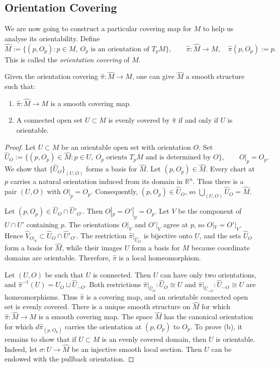 \documentclass[11pt,a4paper]{article}
\begin{document}
\subsection{Orientation Covering}
We are now going to construct a particular covering map for $M$ to help
us analyse its orientability. Define
\[
 \widehat M:=\{(p,O_p):p\in M,\ O_p\text{ is an orientation of }T_pM\},
 \qquad
 \widehat\pi\colon\widehat M\to M,\quad\widehat\pi(p,O_p):=p.
\]
This is called the \emph{orientation covering} of $M$.
\setcounter{theorem}{14}\begin{proposition}
\label{prop:m4-smooth-cover}
Given the orientation covering $\widehat\pi\colon\widehat M\to M$, one can
give $\widehat M$ a smooth structure such that:
\begin{enumerate}[label=(\alph*)]
 \setcounter{enumi}{0}\item $\widehat\pi\colon\widehat M\to M$ is a smooth covering map.
 \setcounter{enumi}{1}\item A connected open set $U\subset M$ is evenly covered by
 $\widehat\pi$ if and only if $U$ is orientable.
\end{enumerate}
\end{proposition}
\begin{proof}
Let $U\subset M$ be an orientable open set with orientation $O$. Set
\[
 \widehat U_O:=
 \{(p,O_p)\in\widehat M:p\in U,\ O_p\text{ orients }T_pM
 \text{ and is determined by }O\},
 \qquad O|_p=O_p.
\]
We show that $\{\widehat U_O\}_{(U,O)}$ forms a basis for $\widehat M$.
Let $(p,O_p)\in\widehat M$. Every chart at $p$ carries a natural orientation induced from its domain in $\mathbb R^n$. Thus there is
a pair $(U,O)$ with $O|_p=O_p$. Consequently, $(p,O_p)\in\widehat U_O$, so
$\bigcup_{(U,O)}\widehat U_O=\widehat M$.

Let $(p,O_p)\in\widehat U_O\cap\widehat U'_{O'}$.
Then $O|_p=O'|_p=O_p$. Let $V$ be the component of $U\cap U'$ containing
$p$. The orientations $O|_V$ and $O'|_V$ agree at $p$, so $O|_V=O'|_V$.
Hence $\widehat V_{O|_V}\subset\widehat U_O\cap\widehat U'_{O'}$.
The restriction $\widehat\pi|_{\widehat U_O}$ is bijective onto $U$,
and the sets $\widehat U_O$ form a basis for $\widehat M$, while their images $U$ form a basis for $M$ because coordinate domains are orientable. Therefore, $\widehat\pi$ is a local homeomorphism.

Let $(U,O)$ be such that $U$ is connected. Then $U$ can have only two
orientations, and
$\widehat\pi^{-1}(U)=\widehat U_O\sqcup\widehat U_{-O}$.
Both restrictions
$\widehat\pi|_{\widehat U_O}\colon\widehat U_O\cong U$ and
$\widehat\pi|_{\widehat U_{-O}}\colon\widehat U_{-O}\cong U$
are homeomorphisms. Thus $\widehat\pi$ is a covering map, and an orientable
connected open set is evenly covered.
There is a unique smooth structure on $\widehat M$ for which
$\widehat\pi\colon\widehat M\to M$ is a smooth covering map.
The space $\widehat M$ has the canonical orientation for which
$d\widehat\pi_{(p,O_p)}$ carries the orientation at $(p,O_p)$ to $O_p$.
To prove (b), it remains to show that if $U\subset M$ is an evenly covered
domain, then $U$ is orientable. Indeed, let
$\sigma\colon U\to\widehat M$ be an injective smooth local section.
Then $U$ can be endowed with the pullback orientation.
\end{proof}
\end{document}
